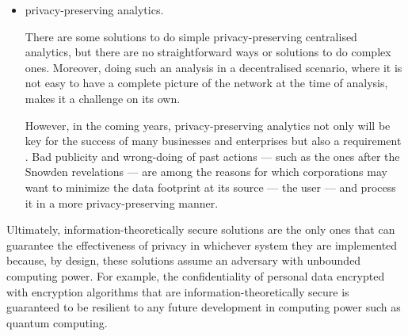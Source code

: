 \begin{itemize}[topsep=\parskip, parsep=\parskip, itemsep=\parskip]
    Although our focus in this work has been on decentralisation of centralised 
    \acp{is}, such as those where there can be various actors --- for example, in 
    \acp{osn}, there are also other scenarios where decentralisation could be of 
    interest
    
    For example, in home care\footnote{Medical care and safety are some controversial 
    matters when it comes to ideal privacy. Consider an unconscious person in a 
    life threatening situation, should her medical history be accessed without her 
    consent? It would be technologically possible to protect such sensitive personal 
    data but it simply does not make sense. However, it is clear it would be a privacy 
    violation allowed in many legislations because the preservation of the human 
    life is an unquestioned obligation.} --- where a nurse carries some sensitive 
    \acl{pii} in order to provide the right care to a patient and eventually returns 
    to the primary care facility with some new personal data about that patient, 
    in content-sharing or even in public ledging of transactions without a \acl{ttp} 
    --- such as those happening in the blockchain powering the crypto-currency \Bitcoin.
    
    \item privacy-preserving analytics.
    
    There are some solutions to do simple privacy-preserving centralised analytics, 
    but there are no straightforward ways or solutions to do complex ones. Moreover, 
    doing such an analysis in a decentralised scenario, where it is not easy to have 
    a complete picture of the network at the time of analysis, makes it a challenge 
    on its own.
    
    However, in the coming years, privacy-preserving analytics not only will be 
    key for the success of many businesses and enterprises but also a requirement 
    \cite{LuZLLS14}. Bad publicity and wrong-doing of past actions --- such as the 
    ones after the Snowden revelations --- are among the reasons for which corporations 
    may want to minimize the data footprint at its source --- the user --- and 
    process it in a more privacy-preserving manner. 
    
\end{itemize}

Ultimately, information-theoretically secure solutions are the only ones that can 
guarantee the effectiveness of privacy in whichever system they are implemented because, 
by design, these solutions assume an adversary with unbounded computing power. 
For example, the confidentiality of personal data encrypted with encryption algorithms 
that are information-theoretically secure is guaranteed to be resilient to any future 
development in computing power such as quantum computing. 

